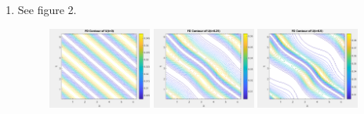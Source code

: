 \documentclass{article}
\begin{document}
\begin{enumerate}[label=\alph*)]

    \item See figure 2.
    \begin{figure}
        \centering
            \includegraphics[width=0.32\textwidth]{t0fdcontour.png}
            \includegraphics[width=0.32\textwidth]{t25fdcontour.png}
            \includegraphics[width=0.32\textwidth]{t5fdcontour.png}
        \emp


\end{figure}
\end{enumerate}
\end{document}
